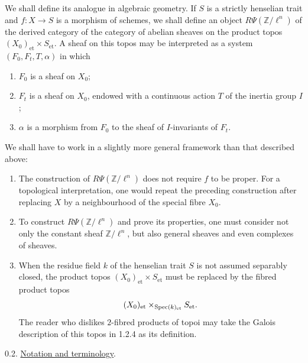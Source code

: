 We shall define its analogue in algebraic geometry.  If $S$ is a
strictly henselian trait and $f:X\longrightarrow S$ is a morphism of
schemes, we shall define an object $R\Psi(\mathbb Z/\ell^n)$ of the
derived category of the category of abelian sheaves on the product
topos $(X_0)_{\mathrm{et}}\times S_{\mathrm{et}}$.  A sheaf on this
topos may be interpreted as a system $(F_0,F_t,T,\alpha)$ in which
\begin{enumerate}[label=\alph*),leftmargin=2.5em]
\item[$\alpha$)] $F_0$ is a sheaf on $X_0$;
\item[$\beta$)] $F_t$ is a sheaf on $X_0$, endowed with a continuous action $T$
of the inertia group $I$;
\item[$\gamma$)] $\alpha$ is a morphism from $F_0$ to the sheaf of $I$-invariants
of $F_t$.
\end{enumerate}

We shall have to work in a slightly more general framework than that
described above:
\begin{enumerate}[label=\alph*),leftmargin=2.5em]
\item The construction of $R\Psi(\mathbb Z/\ell^n)$ does not require
$f$ to be proper.  For a topological interpretation, one would repeat
the preceding construction after replacing $X$ by a neighbourhood of
the special fibre $X_0$.

\item To construct $R\Psi(\mathbb Z/\ell^n)$ and prove its properties,
one must consider not only the constant sheaf $\mathbb Z/\ell^n$, but
also general sheaves and even complexes of sheaves.

\item When the residue field $k$ of the henselian trait $S$ is not
assumed separably closed, the product topos
$(X_0)_{\mathrm{et}}\times S_{\mathrm{et}}$ must be replaced by the
fibred product topos
\begin{equation*}
(X_0)_{\mathrm{et}}
\times_{\operatorname{Spec}(k)_{\mathrm{et}}}S_{\mathrm{et}}.
\end{equation*}
The reader who dislikes $2$-fibred products of topoi may take the Galois
description of this topos in 1.2.4 as its definition.
\end{enumerate}


0.2. \underline{Notation and terminology}.

